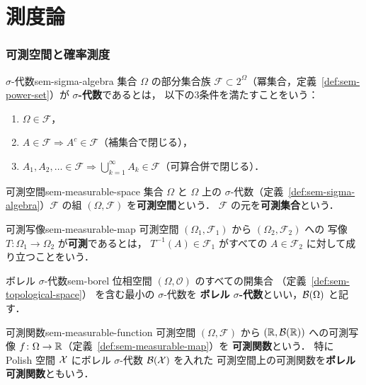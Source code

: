 \chapter{測度論}
\label{ch:found-measure}

\subsection{可測空間と確率測度}
\label{sec:sem-measurable}

\begin{definition}{$\sigma$-代数}{sem-sigma-algebra}
  集合 $\Omega$ の部分集合族 $\mathcal{F} \subset 2^{\Omega}$（冪集合，定義~\ref{def:sem-power-set}）が
  \textbf{$\sigma$-代数}であるとは，
  以下の3条件を満たすことをいう：
  \begin{enumerate}
    \item[(i)] $\Omega \in \mathcal{F}$，
    \item[(ii)] $A \in \mathcal{F} \Longrightarrow A^c \in \mathcal{F}$（補集合で閉じる），
    \item[(iii)] $A_1, A_2, \ldots \in \mathcal{F} \Longrightarrow
      \bigcup_{k=1}^{\infty} A_k \in \mathcal{F}$（可算合併で閉じる）．
  \end{enumerate}
\end{definition}

\begin{definition}{可測空間}{sem-measurable-space}
  集合 $\Omega$ と $\Omega$ 上の $\sigma$-代数（定義~\ref{def:sem-sigma-algebra}）$\mathcal{F}$ の組
  $(\Omega, \mathcal{F})$ を\textbf{可測空間}という．
  $\mathcal{F}$ の元を\textbf{可測集合}という．
\end{definition}

\begin{definition}{可測写像}{sem-measurable-map}
  可測空間 $(\Omega_1, \mathcal{F}_1)$ から $(\Omega_2, \mathcal{F}_2)$ への
  写像 $T \colon \Omega_1 \to \Omega_2$ が\textbf{可測}であるとは，
  $T^{-1}(A) \in \mathcal{F}_1$ がすべての $A \in \mathcal{F}_2$ に対して成り立つことをいう．
\end{definition}

\begin{definition}{ボレル $\sigma$-代数}{sem-borel}
  位相空間 $(\Omega, \mathcal{O})$ のすべての開集合
  （定義~\ref{def:sem-topological-space}）
  を含む最小の $\sigma$-代数を
  \textbf{ボレル $\sigma$-代数}といい，$\mathcal{B}(\Omega)$ と記す．
\end{definition}

\begin{definition}{可測関数}{sem-measurable-function}
  可測空間 $(\Omega, \mathcal{F})$ から $(\mathbb{R}, \mathcal{B}(\mathbb{R}))$ への可測写像
  $f \colon \Omega \to \mathbb{R}$（定義~\ref{def:sem-measurable-map}）を
  \textbf{可測関数}という．
  特に Polish 空間 $\mathcal{X}$ にボレル $\sigma$-代数 $\mathcal{B}(\mathcal{X})$ を入れた
  可測空間上の可測関数を\textbf{ボレル可測関数}ともいう．
\end{definition}

